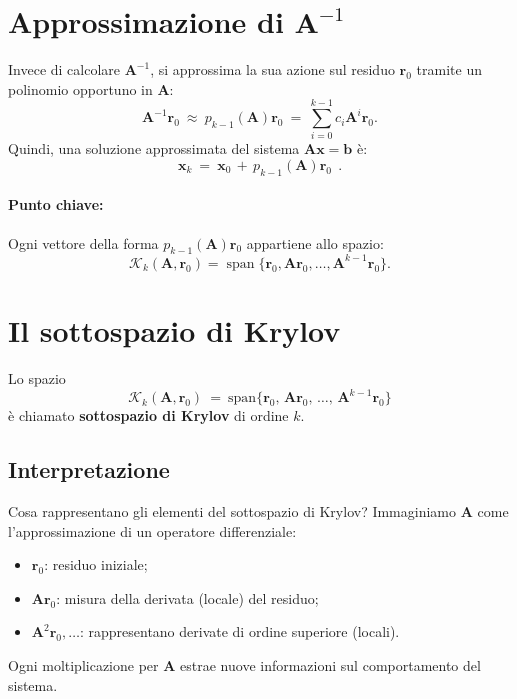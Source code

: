 \section{Approssimazione di $\mathbf{A}^{-1}$}
Invece di calcolare $\mathbf{A}^{-1}$, si approssima la sua azione sul residuo $\mathbf{r}_0$ tramite un polinomio opportuno in $\mathbf{A}$:
\[
\mathbf{A}^{-1} \mathbf{r}_0\ \approx\ p_{k-1}(\mathbf{A}) \mathbf{r}_0\ =\ \sum_{i=0}^{k-1} c_i \mathbf{A}^i \mathbf{r}_0. 
\]
Quindi, una soluzione approssimata del sistema $\mathbf{A} \mathbf{x} = \mathbf{b}$ è:
\[
\mathbf{x}_k\ =\ \mathbf{x}_0\, +\, p_{k-1}(\mathbf{A}) \mathbf{r}_0\ \ . 
\]
\paragraph{Punto chiave:}
Ogni vettore della forma $p_{k-1}(\mathbf{A}) \mathbf{r}_0$ appartiene allo spazio:
\[
\mathcal{K}_k(\mathbf{A}, \mathbf{r}_0) = \operatorname{span}\{\mathbf{r}_0, \mathbf{A} \mathbf{r}_0, \dots, \mathbf{A}^{k-1} \mathbf{r}_0\}. \tag{5}
\]

\section{Il sottospazio di Krylov}

Lo spazio
\[
\mathcal{K}_k(\mathbf{A},\mathbf{r}_0)\ =\ \mathrm{span}\{\mathbf{r}_0,\,\mathbf{A}\mathbf{r}_0,\,\dots ,\,\mathbf{A}^{k - 1}\mathbf{r}_0\}
\]
è chiamato \textbf{sottospazio di Krylov} di ordine $k$.

\subsection{Interpretazione}
Cosa rappresentano gli elementi del sottospazio di Krylov? Immaginiamo $\mathbf{A}$ come l'approssimazione di un operatore differenziale:
\begin{itemize}
	\item $\mathbf{r}_0$: residuo iniziale;
	\item $\mathbf{A}\mathbf{r}_0$: misura della derivata (locale) del residuo;
	\item $\mathbf{A}^2\mathbf{r}_0, \ldots$: rappresentano derivate di ordine superiore (locali).
\end{itemize}
Ogni moltiplicazione per $\mathbf{A}$ estrae nuove informazioni sul comportamento del sistema.

